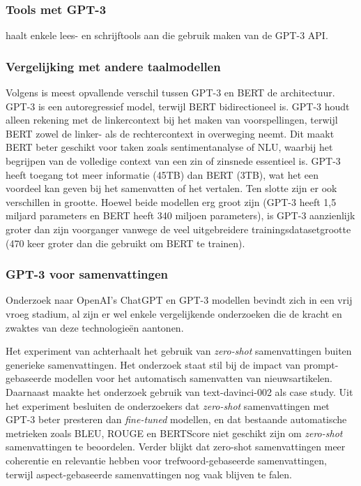 \subsubsection{Tools met GPT-3}

\textcite{Mottesi2023} haalt enkele lees- en schrijftools aan die gebruik maken van de GPT-3 API.

\subsubsection{Vergelijking met andere taalmodellen}

Volgens \textcite{Mottesi2023} is meest opvallende verschil tussen GPT-3 en BERT de architectuur. GPT-3 is een autoregressief model, terwijl BERT bidirectioneel is. GPT-3 houdt alleen rekening met de linkercontext bij het maken van voorspellingen, terwijl BERT zowel de linker- als de rechtercontext in overweging neemt. Dit maakt BERT beter geschikt voor taken zoals sentimentanalyse of NLU, waarbij het begrijpen van de volledige context van een zin of zinsnede essentieel is. GPT-3 heeft toegang tot meer informatie (45TB) dan BERT (3TB), wat het een voordeel kan geven bij het samenvatten of het vertalen. Ten slotte zijn er ook verschillen in grootte. Hoewel beide modellen erg groot zijn (GPT-3 heeft 1,5 miljard parameters en BERT heeft 340 miljoen parameters), is GPT-3 aanzienlijk groter dan zijn voorganger vanwege de veel uitgebreidere trainingsdatasetgrootte (470 keer groter dan die gebruikt om BERT te trainen).

\subsubsection{GPT-3 voor samenvattingen}





Onderzoek naar OpenAI's ChatGPT en GPT-3 modellen bevindt zich in een vrij vroeg stadium, al zijn er wel enkele vergelijkende onderzoeken die de kracht en zwaktes van deze technologieën aantonen.

Het experiment van \textcite{Goyal2022} achterhaalt het gebruik van \textit{zero-shot} samenvattingen buiten generieke samenvattingen. Het onderzoek staat stil bij de impact van prompt-gebaseerde modellen voor het automatisch samenvatten van nieuwsartikelen. Daarnaast maakte het onderzoek gebruik van text-davinci-002 als case study. Uit het experiment besluiten de onderzoekers dat \textit{zero-shot} samenvattingen met GPT-3 beter presteren dan \textit{fine-tuned} modellen, en dat bestaande automatische metrieken zoals BLEU, ROUGE en BERTScore niet geschikt zijn om \textit{zero-shot} samenvattingen te beoordelen. Verder blijkt dat zero-shot samenvattingen meer coherentie en relevantie hebben voor trefwoord-gebaseerde samenvattingen, terwijl aspect-gebaseerde samenvattingen nog vaak blijven te falen.

